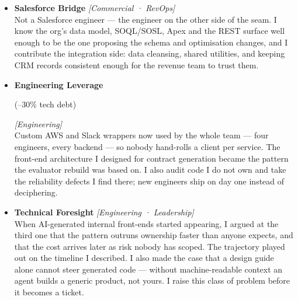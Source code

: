 \documentclass[11pt,a4paper,sans]{moderncv}
\newcommand{\impact}[1]{{\color{slate}\small #1}}
\newcommand{\metric}[1]{%
  \begingroup
  \setlength{\fboxsep}{2pt}%
  \colorbox{whisper}{\color{navy}\bfseries\strut #1}%
  \endgroup
}
\newcommand{\stakeholders}[1]{{\color{azure}\footnotesize\textsf{\textit{[#1]}}}}
\newcommand{\rolebold}[1]{{\color{navy}\bfseries #1}}
\begin{document}
{\begin{itemize}
    \item \rolebold{Salesforce Bridge} \stakeholders{Commercial · RevOps}\\
      \impact{Not a Salesforce engineer --- the engineer on the other side of the seam. I know the org's data model, SOQL/SOSL, Apex and the REST surface well enough to be the one proposing the schema and optimisation changes, and I contribute the integration side: data cleansing, shared utilities, and keeping CRM records consistent enough for the revenue team to trust them.}
    \item \rolebold{Engineering Leverage} \metric{(--30\% tech debt)} \stakeholders{Engineering}\\
      \impact{Custom AWS and Slack wrappers now used by the whole team --- four engineers, every backend --- so nobody hand-rolls a client per service. The front-end architecture I designed for contract generation became the pattern the evaluator rebuild was based on. I also audit code I do not own and take the reliability defects I find there; new engineers ship on day one instead of deciphering.}
    \item \rolebold{Technical Foresight} \stakeholders{Engineering · Leadership}\\
      \impact{When AI-generated internal front-ends started appearing, I argued at the third one that the pattern outruns ownership faster than anyone expects, and that the cost arrives later as risk nobody has scoped. The trajectory played out on the timeline I described. I also made the case that a design guide alone cannot steer generated code --- without machine-readable context an agent builds a generic product, not yours. I raise this class of problem before it becomes a ticket.}
  \end{itemize}
}
\end{document}
